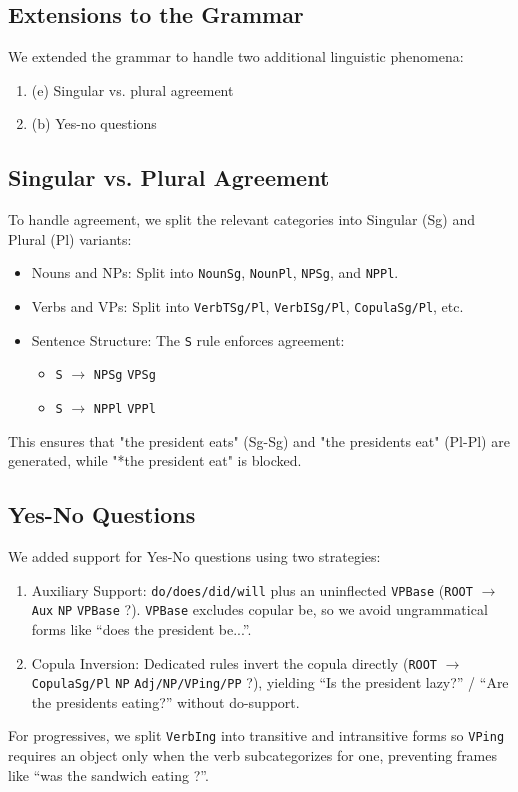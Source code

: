 \documentclass{article}
\begin{document}
\subsection*{Extensions to the Grammar}
We extended the grammar to handle two additional linguistic phenomena:
\begin{enumerate}
    \item (e) Singular vs. plural agreement
    \item (b) Yes-no questions
\end{enumerate}

\subsection*{Singular vs. Plural Agreement}
To handle agreement, we split the relevant categories into Singular (Sg) and Plural (Pl) variants:
\begin{itemize}
    \item Nouns and NPs: Split into \texttt{NounSg}, \texttt{NounPl}, \texttt{NPSg}, and \texttt{NPPl}.
    \item Verbs and VPs: Split into \texttt{VerbTSg/Pl}, \texttt{VerbISg/Pl}, \texttt{CopulaSg/Pl}, etc.
    \item Sentence Structure: The \texttt{S} rule enforces agreement:
    \begin{itemize}
        \item \texttt{S} $\to$ \texttt{NPSg} \texttt{VPSg}
        \item \texttt{S} $\to$ \texttt{NPPl} \texttt{VPPl}
    \end{itemize}
\end{itemize}
This ensures that "the president eats" (Sg-Sg) and "the presidents eat" (Pl-Pl) are generated, while "*the president eat" is blocked.

\subsection*{Yes-No Questions}
We added support for Yes-No questions using two strategies:
\begin{enumerate}
    \item Auxiliary Support: \texttt{do/does/did/will} plus an uninflected \texttt{VPBase} (\texttt{ROOT} $\to$ \texttt{Aux} \texttt{NP} \texttt{VPBase} ?). \texttt{VPBase} excludes copular be, so we avoid ungrammatical forms like ``does the president be...''.
    \item Copula Inversion: Dedicated rules invert the copula directly (\texttt{ROOT} $\to$ \texttt{CopulaSg/Pl} \texttt{NP} \texttt{Adj/NP/VPing/PP} ?), yielding ``Is the president lazy?'' / ``Are the presidents eating?'' without do-support.
\end{enumerate}
For progressives, we split \texttt{VerbIng} into transitive and intransitive forms so \texttt{VPing} requires an object only when the verb subcategorizes for one, preventing frames like ``was the sandwich eating ?''.
\end{document}

